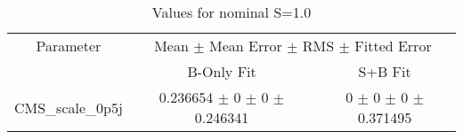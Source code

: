 \begin{table}
\centering
\caption{Values for nominal S=1.0}
\begin{tabular}{ccc}
\toprule
Parameter & \multicolumn{2}{c}{Mean $\pm$ Mean Error $\pm$ RMS $\pm$ Fitted Error}\\
 & B-Only Fit & S+B Fit\\
\midrule
CMS\_scale\_0p5j & \num{0.236654} $\pm$ \num{0} $\pm$ \num{0} $\pm$ \num{0.246341} & \num{0} $\pm$ \num{0} $\pm$ \num{0} $\pm$ \num{0.371495}\\
\bottomrule
\end{tabular}
\end{table}